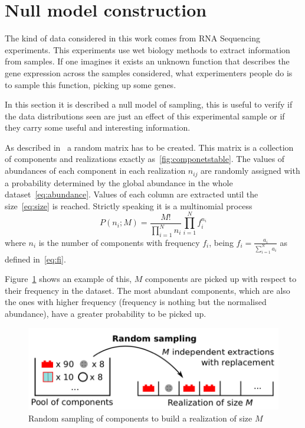 \section{Null model construction}\label{sec:nullmodel}
The kind of data considered in this work comes from RNA Sequencing experiments. This experiments use wet biology methods to extract information from samples. If one imagines it exists an unknown function that describes the gene expression across the samples considered, what experimenters people do is to sample  this function, picking up some genes.

In this section it is described a null model of sampling, this is useful to verify if the data distributions seen are just an effect of this experimental sample or if they carry some useful and interesting information.

As described in~\cite{mazzolini2018heaps} a random matrix has to be created. This matrix is a collection of components and realizations exactly as~\ref{fig:componetstable}. The values of abundances of each component in each realization $n_{i j}$ are randomly assigned with a probability determined by 
the global abundance in the whole dataset~\ref{eq:abundance}. Values of each column are extracted until the size~\ref{eq:size} is 
reached. Strictly speaking it is a multinomial process
\begin{equation}
P\left({n_i};M\right)=\frac{M!}{\prod_{i=1}^{N} n_i}\prod_{i=1}^N f_i^{n_i}
\end{equation}
where $n_i$ is the number of components with frequency $f_i$, being $f_i=\frac{a_i}{\sum_{i=1}^{N}a_{i}}$ as defined in~\ref{eq:fi}.

Figure~\ref{fig:structure/randomsampling} shows an example of this, $M$ components are picked up with respect to their frequency in the dataset. The most abundant components, which are also the ones with higher frequency (frequency is nothing but the normalised abundance), have a greater probability to be picked up.
\begin{figure}[htb!]
    \centering
    \includegraphics[width=0.8\linewidth]{pictures/structure/randomsampling.png}
    \caption{Random sampling of components to build a realization of size $M$}
    \label{fig:structure/randomsampling}
\end{figure}

